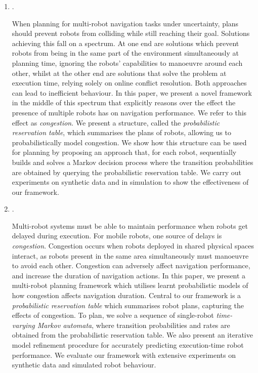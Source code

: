 \documentclass[12pt]{article}
\begin{document}
\begin{enumerate}
\item {}.

When planning for multi-robot navigation tasks under uncertainty, plans should prevent robots from colliding while still reaching their goal. 
%
Solutions achieving this fall on a spectrum. 
%
At one end are solutions which prevent robots from being in the same part of the environment simultaneously at planning time, ignoring the robots' capabilities to manoeuvre around each other, whilst at the other end are solutions that solve the problem at execution time, relying solely on online conflict resolution. 
%
Both approaches can lead to inefficient behaviour. 
%
In this paper, we present a novel framework in the middle of this spectrum that explicitly reasons over the effect the presence of multiple robots has on navigation performance. 
%
We refer to this effect as \emph{congestion}. 
%
We present a structure, called the \emph{probabilistic reservation table}, which summarises the plans of robots, allowing us to probabilistically model congestion.
%
We show how this structure can be used for planning by proposing an approach that, for each robot, sequentially builds and solves a Markov decision process where the transition probabilities are obtained by querying the probabilistic reservation table.
%
We carry out experiments on synthetic data and in simulation to show the effectiveness of our framework.

\item {}.

Multi-robot systems must be able to maintain performance when robots get delayed during execution.
%
For mobile robots, one source of delays is \emph{congestion}.
%
Congestion occurs when robots deployed in shared physical spaces interact, as robots present in the same area simultaneously must manoeuvre to avoid each other.
%
Congestion can adversely affect navigation performance, and increase the duration of navigation actions.
%
In this paper, we present a multi-robot planning framework which utilises learnt probabilistic models of how congestion affects navigation duration. 
%
Central to our framework is a \emph{probabilistic reservation table} which summarises robot plans, capturing the effects of congestion.
%
To plan, we solve a sequence of single-robot \emph{time-varying Markov automata}, where transition probabilities and rates are obtained from the probabilistic reservation table.
% 
We also present an iterative model refinement procedure for accurately predicting execution-time robot performance.
% 
We evaluate our framework with extensive experiments on synthetic data and simulated robot behaviour.

\end{enumerate}
\end{document}
